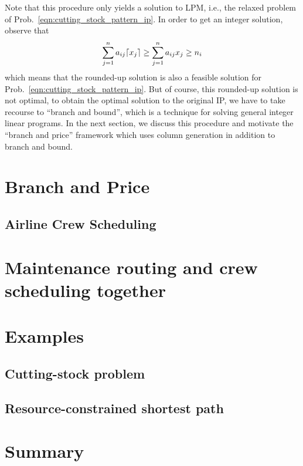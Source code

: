 \documentclass[letterpaper, 10pt, twocolumn, reqno]{amsart}
\begin{document}
Note that this procedure only yields a solution to LPM, i.e., the relaxed problem of Prob.~\eqref{eqn:cutting_stock_pattern_ip}. In order to get an integer solution, observe that
$$
\sum_{j=1}^n a_{ij} \lceil x_j\rceil \geq \sum_{j=1}^n a_{ij} x_j \geq n_i
$$
which means that the rounded-up solution is also a feasible solution for Prob.~\eqref{eqn:cutting_stock_pattern_ip}. But of course, this rounded-up solution is not optimal, to obtain the optimal solution to the original IP, we have to take recourse to ``branch and bound'', which is a technique for solving general integer linear programs. In the next section, we discuss this procedure and motivate the ``branch and price'' framework which uses column generation in addition to branch and bound.

\section{Branch and Price}
\label{sec:branch_and_price}

\subsection{Airline Crew Scheduling}
\label{ssec:crew_scheduling}

\section{Maintenance routing and crew scheduling together}
\label{sec:integrated}


\section{Examples}
\label{sec:examples}

\subsection{Cutting-stock problem}
\label{ssec:eg_cutting_stock}

\subsection{Resource-constrained shortest path}
\label{ssec:eg_shortest_path}


\section{Summary}
\label{sec:summary}


{
\small


}
\end{document}
